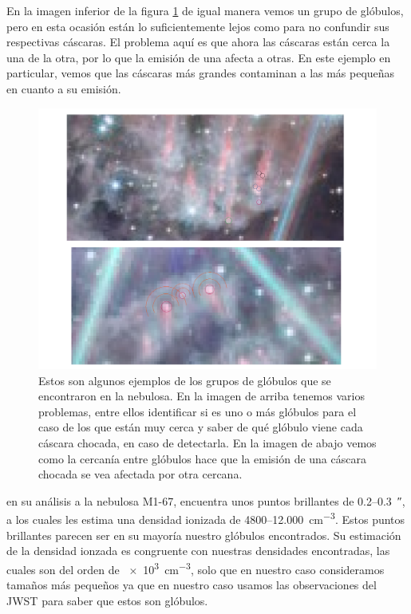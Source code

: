 \documentclass{book}
\begin{document}
En la imagen inferior de la figura \ref{globule_group} de igual manera vemos un grupo de glóbulos, pero en esta ocasión están lo suficientemente lejos como para no confundir sus respectivas cáscaras. El problema aquí es que ahora las cáscaras están cerca la una de la otra, por lo que la emisión de una afecta a otras. En este ejemplo en particular, vemos que las cáscaras más grandes contaminan a las más pequeñas en cuanto a su emisión.\\

\begin{figure}[htb]
    \centering
    \includegraphics[width=\textwidth]{discusion/groups_globules.pdf}
    \caption{Estos son algunos ejemplos de los grupos de glóbulos que se encontraron en la nebulosa. En la imagen de arriba tenemos varios problemas, entre ellos identificar si es uno o más glóbulos para el caso de los que están muy cerca y saber de qué glóbulo viene cada cáscara chocada, en caso de detectarla. En la imagen de abajo vemos como la cercanía entre glóbulos hace que la emisión de una cáscara chocada se vea afectada por otra cercana.}
    \label{globule_group}
\end{figure}

\cite{Grosdidier:1998} en su análisis a la nebulosa M1-67, encuentra unos puntos brillantes de 0.2--\SI{0.3}{\arcsecond}, a los cuales les estima una densidad ionizada de 4800--\SI{12,000}{cm^{-3}}. Estos puntos brillantes parecen ser en su mayoría nuestro glóbulos encontrados. Su estimación de la densidad ionzada es congruente con nuestras densidades encontradas, las cuales son del orden de \SI{e3}{cm^{-3}}, solo que en nuestro caso consideramos tamaños más pequeños ya que en nuestro caso usamos las observaciones del JWST para saber que estos son glóbulos. 
\end{document}
